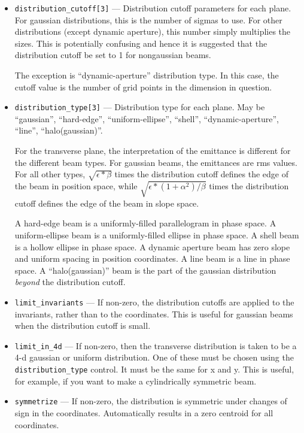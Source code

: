 \documentclass[11pt]{article}
\begin{document}
\begin{itemize}
\item \verb|distribution_cutoff[3]| --- Distribution cutoff parameters
for each plane.  For gaussian distributions, this is the number of
sigmas to use.  For other distributions (except dynamic aperture),
this number simply multiplies the sizes.  This is potentially
confusing and hence it is suggested that the distribution cutoff be
set to 1 for nongaussian beams.

The exception is ``dynamic-aperture'' distribution type.  In this case,
the cutoff value is the number of grid points in the dimension in question.

\item \verb|distribution_type[3]| --- Distribution type for each
plane.  May be ``gaussian'', ``hard-edge'', ``uniform-ellipse'',
``shell'', ``dynamic-aperture'', ``line'', ``halo(gaussian)''.

For the transverse plane, the interpretation of the emittance is
different for the different beam types.  For gaussian beams, the
emittances are rms values.  For all other types, $\sqrt{\epsilon*\beta}$
times the distribution cutoff defines the edge of the beam in position
space, while $\sqrt{\epsilon*(1+\alpha^2)/\beta}$ times the distribution
cutoff defines the edge of the beam in slope space.  

A hard-edge beam is a uniformly-filled parallelogram in phase space.
A uniform-ellipse beam is a uniformly-filled ellipse in phase space.
A shell beam is a hollow ellipse in phase space.  A dynamic aperture
beam has zero slope and uniform spacing in position coordinates.  A
line beam is a line in phase space.  A ``halo(gaussian)'' beam is
the part of the gaussian distribution {\em beyond} the distribution cutoff.

\item \verb|limit_invariants| --- If non-zero, the distribution
cutoffs are applied to the invariants, rather than to the coordinates.
This is useful for gaussian beams when the distribution cutoff is
small.

\item \verb|limit_in_4d| --- If non-zero, then the transverse
distribution is taken to be a 4-d gaussian or uniform distribution.
One of these must be chosen using the \verb|distribution_type|
control.  It must be the same for x and y.  This is useful, for
example, if you want to make a cylindrically symmetric beam.

\item \verb|symmetrize| --- If non-zero, the distribution is symmetric
under changes of sign in the coordinates.  Automatically results in a
zero centroid for all coordinates.


\end{itemize}
\end{document}

